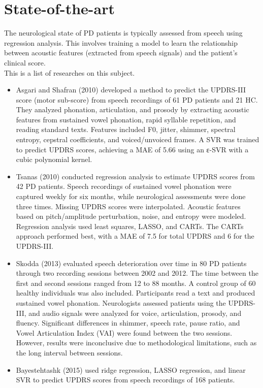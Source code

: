 \section{State-of-the-art}
The neurological state of PD patients is typically assessed from speech using regression analysis. This involves training a model to learn the relationship between acoustic features (extracted from speech signals) and the patient’s clinical score.\\ This is a list of researches on this subject.


\begin{itemize}
    \item Asgari and Shafran (2010) developed a method to predict the UPDRS-III score (motor sub-score) from speech recordings of 61 PD patients and 21 HC. They analyzed phonation, articulation, and prosody by extracting acoustic features from sustained vowel phonation, rapid syllable repetition, and reading standard texts. Features included F0, jitter, shimmer, spectral entropy, cepstral coefficients, and voiced/unvoiced frames. A SVR was trained to predict UPDRS scores, achieving a MAE of 5.66 using an ε-SVR with a cubic polynomial kernel.
    \item Tsanas (2010) conducted regression analysis to estimate UPDRS scores from 42 PD patients. Speech recordings of sustained vowel phonation were captured weekly for six months, while neurological assessments were done three times. Missing UPDRS scores were interpolated. Acoustic features based on pitch/amplitude perturbation, noise, and entropy were modeled. Regression analysis used least squares, LASSO, and CARTs. The CARTs approach performed best, with a MAE of 7.5 for total UPDRS and 6 for the UPDRS-III.
    \item Skodda (2013) evaluated speech deterioration over time in 80 PD patients through two recording sessions between 2002 and 2012. The time between the first and second sessions ranged from 12 to 88 months. A control group of 60 healthy individuals was also included. Participants read a text and produced sustained vowel phonation. Neurologists assessed patients using the UPDRS-III, and audio signals were analyzed for voice, articulation, prosody, and fluency. Significant differences in shimmer, speech rate, pause ratio, and Vowel Articulation Index (VAI) were found between the two sessions. However, results were inconclusive due to methodological limitations, such as the long interval between sessions.
    \item Bayestehtashk (2015) used ridge regression, LASSO regression, and linear SVR to predict UPDRS scores from speech recordings of 168 patients.

\end{itemize}
